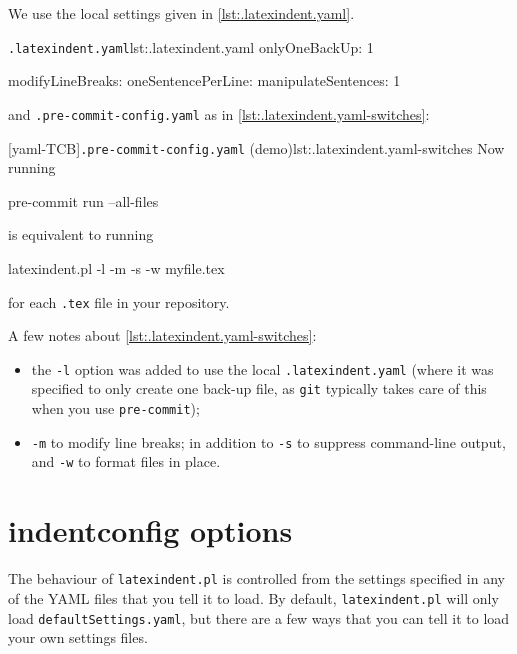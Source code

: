   \begin{example}
  We use the local settings given in \cref{lst:.latexindent.yaml}.
  \begin{cmhlistings}[style=tcblatex]{\texttt{.latexindent.yaml}}{lst:.latexindent.yaml}
onlyOneBackUp: 1

modifyLineBreaks:
 oneSentencePerLine:
   manipulateSentences: 1
\end{cmhlistings}

  and \texttt{.pre-commit-config.yaml} as in \cref{lst:.latexindent.yaml-switches}:

  [yaml-TCB]{\texttt{.pre-commit-config.yaml} (demo)}{lst:.latexindent.yaml-switches}
  Now running

  \begin{commandshell}
pre-commit run --all-files
\end{commandshell}

  is equivalent to running

  \begin{commandshell}
latexindent.pl -l -m -s -w myfile.tex
\end{commandshell}

  for each \texttt{.tex} file in your repository.

  A few notes about \cref{lst:.latexindent.yaml-switches}:
  \begin{itemize}
   \item the \texttt{-l} option was added to use the local \texttt{.latexindent.yaml}
         (where it was specified to only create one back-up file, as \texttt{git}
         typically takes care of this when you use \texttt{pre-commit});
   \item \texttt{-m} to modify line breaks; in addition to \texttt{-s} to suppress command-line
         output, and \texttt{-w} to format files in place.
  \end{itemize}
  \end{example}

 \section{indentconfig options}\label{app:indentconfig:options}
  The behaviour of \texttt{latexindent.pl} is controlled from the settings specified in
  any of the YAML files that you tell it to load. By default, \texttt{latexindent.pl}
  will only load \texttt{defaultSettings.yaml}, but there are a few ways that you can
  tell it to load your own settings files.

